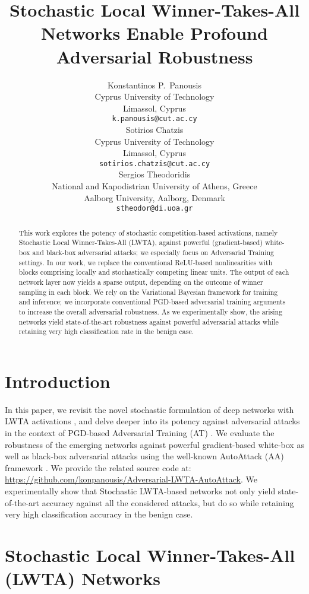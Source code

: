 \documentclass{article}
\title{Stochastic Local Winner-Takes-All Networks Enable Profound Adversarial Robustness}
\author{Konstantinos P.~Panousis \\
	Cyprus University of Technology\\
	Limassol, Cyprus \\
	\texttt{k.panousis@cut.ac.cy} \\
\And
Sotirios Chatzis\\
	Cyprus University of Technology\\
	Limassol, Cyprus \\
	\texttt{sotirios.chatzis@cut.ac.cy} \\
\AND
Sergios Theodoridis\\
	National and Kapodistrian University of Athens, Greece\\
	Aalborg University, Aalborg, Denmark\\
\texttt{stheodor@di.uoa.gr} 
}
\begin{document}
	
	\maketitle
	
	\begin{abstract}
		This work explores the potency of stochastic competition-based activations, namely Stochastic Local Winner-Takes-All (LWTA), against powerful (gradient-based) white-box and black-box adversarial attacks; we especially focus on Adversarial Training settings. In our work, we replace the conventional ReLU-based nonlinearities with blocks comprising locally and stochastically competing linear units. The output of each network layer now yields a sparse output, depending on the outcome of winner sampling in each block. We rely on the Variational Bayesian framework for training and inference; we incorporate conventional PGD-based adversarial training arguments to increase the overall adversarial robustness. As we experimentally show, the arising networks yield state-of-the-art robustness against powerful adversarial attacks while retaining very high classification rate in the benign case.
	\end{abstract}
	
	\section{Introduction}
	
	In this paper, we revisit the novel stochastic formulation of deep networks with LWTA activations  \citep{panousis2019nonparametric, panousis21a},  and delve deeper into its potency against adversarial attacks in the context of PGD-based Adversarial Training (AT) \citep{madry2017towards}. We evaluate the robustness of the emerging networks against powerful gradient-based white-box as well as black-box adversarial attacks using the well-known AutoAttack (AA) framework \citep{croce2020reliable}. We provide the related source code at: \url{https://github.com/konpanousis/Adversarial-LWTA-AutoAttack}. 
	We experimentally show that Stochastic LWTA-based networks not only yield state-of-the-art accuracy against all the considered attacks, but do so while retaining very high classification accuracy in the benign case.
	
\section{Stochastic Local Winner-Takes-All (LWTA) Networks}
	
\end{document}
